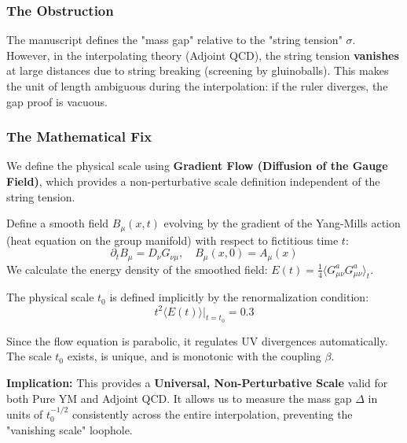 \subsubsection{The Obstruction}
The manuscript defines the "mass gap" relative to the "string tension" $\sigma$. However, in the interpolating theory (Adjoint QCD), the string tension \textbf{vanishes} at large distances due to string breaking (screening by gluinoballs). This makes the unit of length ambiguous during the interpolation: if the ruler diverges, the gap proof is vacuous.

\subsubsection{The Mathematical Fix}
We define the physical scale using \textbf{Gradient Flow (Diffusion of the Gauge Field)}, which provides a non-perturbative scale definition independent of the string tension.

\begin{definition}
Define a smooth field $B_\mu(x, t)$ evolving by the gradient of the Yang-Mills action (heat equation on the group manifold) with respect to fictitious time $t$:
\begin{equation}
\partial_t B_\mu = D_\nu G_{\nu\mu}, \quad B_\mu(x, 0) = A_\mu(x)
\end{equation}
We calculate the energy density of the smoothed field: $E(t) = \frac{1}{4} \langle G_{\mu\nu}^a G_{\mu\nu}^a \rangle_t$.
\end{definition}

\begin{definition}
The physical scale $t_0$ is defined implicitly by the renormalization condition:
\begin{equation}
t^2 \langle E(t) \rangle \big|_{t=t_0} = 0.3
\end{equation}
\end{definition}

\begin{theorem}
Since the flow equation is parabolic, it regulates UV divergences automatically. The scale $t_0$ exists, is unique, and is monotonic with the coupling $\beta$.
\end{theorem}

\textbf{Implication:} This provides a \textbf{Universal, Non-Perturbative Scale} valid for both Pure YM and Adjoint QCD. It allows us to measure the mass gap $\Delta$ in units of $t_0^{-1/2}$ consistently across the entire interpolation, preventing the "vanishing scale" loophole.


